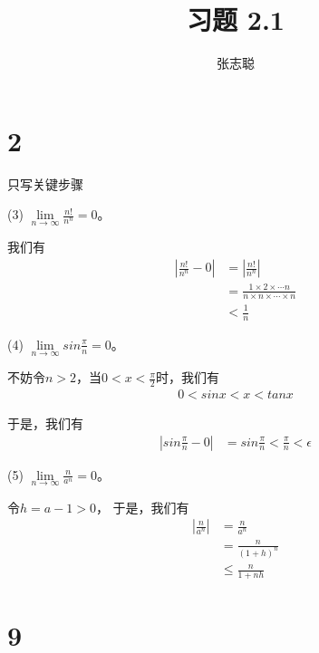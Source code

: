 \documentclass{article}
\begin{document}
\title{习题 2.1}
\author{张志聪}
\maketitle

\section*{2}

只写关键步骤

(3) $\lim\limits_{n \to \infty} \frac{n!}{n^n} = 0$。

我们有
\begin{align*}
  |\frac{n!}{n^n} - 0|
   & = |\frac{n!}{n^n}|                                                     \\
   & = \frac{1 \times 2 \times \cdots n}{n \times n \times \cdots \times n} \\
   & < \frac{1}{n}
\end{align*}

(4) $\lim\limits_{n \to \infty} sin \frac{\pi}{n} = 0$。

不妨令$n > 2$，当$0 < x < \frac{\pi}{2}$时，我们有
\begin{align*}
  0 < sin x < x < tan x
\end{align*}

于是，我们有
\begin{align*}
  |sin \frac{\pi}{n} - 0|
   & = sin \frac{\pi}{n} < \frac{\pi}{n} < \epsilon
\end{align*}

(5) $\lim\limits_{n \to \infty} \frac{n}{a^n} = 0$。

令$h = a - 1 > 0$，
于是，我们有
\begin{align*}
  |\frac{n}{a^n}|
   & = \frac{n}{a^n}       \\
   & = \frac{n}{(1 + h)^n} \\
   & \leq \frac{n}{1 + nh}
\end{align*}

\section*{9}
\end{document}
